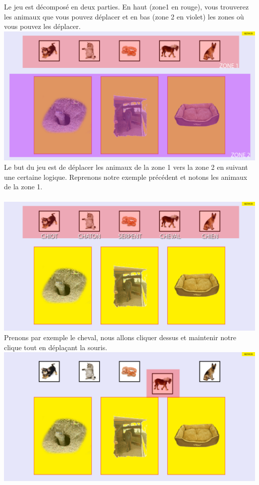\documentclass{article}
\begin{document}
Le jeu est d\'ecompos\'e en deux parties. En haut (zone1 en rouge), vous trouverez les animaux que vous pouvez d\'eplacer et en bas (zone 2 en violet) les zones o\`u vous pouvez les d\'eplacer.
\vspace{0.5cm}\\
\includegraphics[width=1.0\textwidth]{zone}
\vspace{0.5cm}\\
Le but du jeu est de d\'eplacer les animaux de la zone 1 vers la zone 2 en suivant une certaine logique. Reprenons notre exemple pr\'ec\'edent et notons les animaux de la zone 1.\\
\vspace{0.5cm}\\
\includegraphics[width=1.0\textwidth]{zone1}
\vspace{0.5cm}\\
Prenons par exemple le cheval, nous allons cliquer dessus et maintenir notre clique tout en d\'epla\c{c}ant la souris.
\vspace{0.5cm}\\
\includegraphics[width=1.0\textwidth]{zone2}
\end{document}
